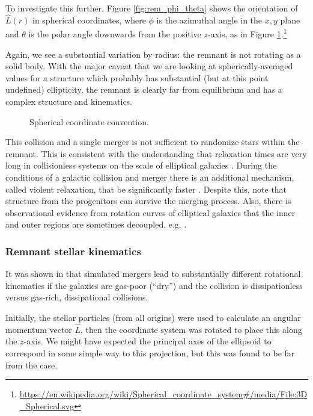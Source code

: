 \documentclass[twocolumn]{aastex63}
\newcommand{\todo}{\color{red}{TODO}\color{black}\hspace{2mm}}
\begin{document}
To investigate this further, Figure \ref{fig:rem_phi_theta} shows the orientation of $\hat{L}(r)$ in spherical coordinates, where $\phi$ is the azimuthal angle in the $x,y$ plane and $\theta$ is the polar angle downwards from the positive $z$-axis, as in Figure \ref{fig:sph_coord}.\footnote{\url{https://en.wikipedia.org/wiki/Spherical\_coordinate\_system\#/media/File:3D\_Spherical.svg}} 

Again, we see a substantial variation by radius: the remnant is not rotating as a solid body. With the major caveat that we are looking at spherically-averaged values for a structure which probably has substantial (but at this point undefined) ellipticity, the remnant is clearly far from equilibrium and has a complex structure and kinematics.

\begin{figure}[htb!]
	\caption{Spherical coordinate convention.
		\label{fig:sph_coord}}
\end{figure}

This collision and a single merger is not sufficient to randomize stars within the remnant. This is consistent with the understanding that relaxation times are very long in collisionless systems on the scale of elliptical galaxies \citep[Section 1.2]{binney_galactic_2008}. During the conditions of a galactic collision and merger there is an additional mechanism, called violent relaxation, that be significantly faster \citep[Section 4.10.2]{binney_galactic_2008}. Despite this, \citet{barnes_dynamics_1992} note that structure from the progenitors can survive the merging process. Also, there is observational evidence from rotation curves of elliptical galaxies that the inner and outer regions are sometimes decoupled, e.g. \citep{napolitano_ngc_2002}.

\todo{distinguish by origin}


\subsubsection{Remnant stellar kinematics}

It was shown in \citep{cox_kinematic_2006} that simulated mergers lead to substantially different rotational kinematics if the galaxies are gas-poor (``dry'') and the collision is dissipationless versus gas-rich, dissipational collisions. \todo{expand!}

Initially, the stellar particles (from all origins) were used to calculate an angular momentum vector $\hat{L}$, then the coordinate system was rotated to place this along the $z$-axis. We might have expected the principal axes of the ellipsoid to correspond in some simple way to this projection, but this was found to be far from the case.
\end{document}
